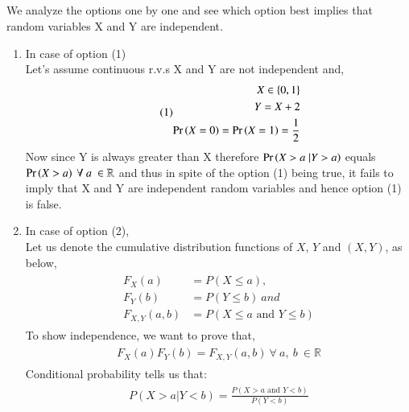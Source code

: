 \documentclass[journal,12pt,twocolumn]{IEEEtran}
\begin{document}
\subsection*{}
We analyze the options one by one and see which option best implies that random variables X and Y are independent. \\
\begin{enumerate}
    \item In case of option (1)\\
Let's assume continuous r.v.s X and Y are not independent and, \\
\begin{align}\tag{1}
    \begin{split}
        X \in \{0, 1\}\\
        Y = X + 2\\
        \Pr\left(X=0\right) = \Pr\left(X=1\right) = \dfrac{1}{2}\\
    \end{split}
\end{align}
Now since Y is always greater than X therefore $\Pr\left(X>a \;| Y>a\right)$ equals $\Pr\left(X > a\right)\ \forall\ a\ \in \mathbb{R}$ and thus in spite of the option (1) being true, it fails to imply that X and Y are independent random variables and hence option (1) is false.\\
    \item In case of option (2),\\
Let us denote the cumulative distribution functions of $X$, $Y$ and $(X, Y)$, as below,\\
\begin{align}\tag{2}
    \begin{split}
        F_X(a) &= P(X \leq a),\\
        F_Y(b) &= P(Y \leq b)\ and \\
        F_{X,Y}(a,b) &= P(X \leq a \mbox{ and } Y \leq b) 
    \end{split}
\end{align}
To show independence, we want to prove that,
\begin{align}\tag{3}
    \begin{split}
        F_X(a)F_Y(b) = F_{X, Y}(a,b)\ \forall\ a,\ b\ \in \mathbb{R}
    \end{split}
\end{align}
Conditional probability tells us that: 
\begin{align}\tag{4}
    \begin{split}
        P(X > a | Y < b) = \frac{P(X > a \mbox{ and } Y < b)}{P(Y < b)}

\end{split}
\end{align}
\end{enumerate}
\end{document}
